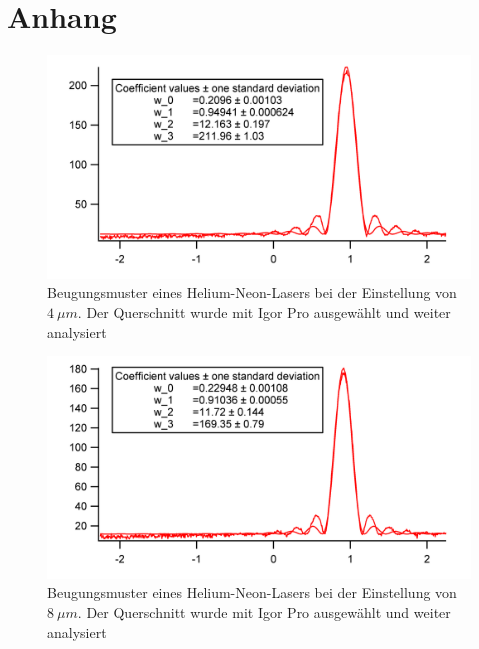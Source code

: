 

\setlength\abovedisplayshortskip{20pt}
\setlength\belowdisplayshortskip{20pt}
\setlength\abovedisplayskip{20pt}
\setlength\belowdisplayskip{20pt}
\section {Anhang}
\begin{figure}[H]
	\centering	
	\begin{minipage}{1\textwidth}
		\includegraphics[width=\columnwidth]{180618/Graph1.png}
	\end{minipage}
	\caption{Beugungsmuster eines Helium-Neon-Lasers bei der Einstellung von $4~\mu m$. Der Querschnitt wurde mit Igor Pro ausgewählt und weiter analysiert }
	\label{HeNe_1}
\end{figure}
\begin{figure}[H]
	\centering	
	\begin{minipage}{1\textwidth}
		\includegraphics[width=\columnwidth]{180618/Graph2.png}
	\end{minipage}
	\caption{Beugungsmuster eines Helium-Neon-Lasers bei der Einstellung von $8~\mu m$. Der Querschnitt wurde mit Igor Pro ausgewählt und weiter analysiert }
	\label{HeNe_2}
\end{figure}
